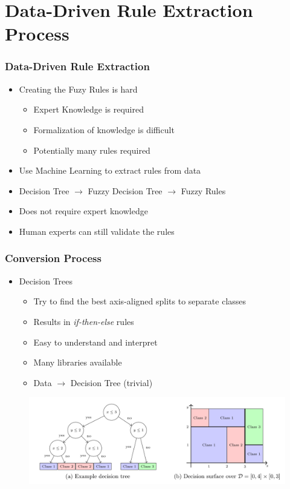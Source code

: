 \documentclass[
	10pt,
	t		%
]{beamer}
\begin{document}
\section{Data-Driven Rule Extraction Process}
\begin{frame}
	\frametitle{Data-Driven Rule Extraction}
	\begin{itemize}
		\item Creating the Fuzy Rules is hard
		      \begin{itemize}
			      \item Expert Knowledge is required
			      \item Formalization of knowledge is difficult
			      \item Potentially many rules required
		      \end{itemize}
		\item Use Machine Learning to extract rules from data
		\item Decision Tree $\rightarrow$ Fuzzy Decision Tree $\rightarrow$ Fuzzy Rules {\footnotesize \cite{CROCKETT20062809}}
		\item Does not require expert knowledge
		\item Human experts can still validate the rules
	\end{itemize}
\end{frame}

\begin{frame}
	\frametitle{Conversion Process}

	\begin{itemize}
		\item Decision Trees
		      \begin{itemize}
			      \item Try to find the best axis-aligned splits to separate classes
			      \item Results in \textit{if-then-else} rules
			      \item Easy to understand and interpret
			      \item Many libraries available
			      \item Data $\rightarrow$ Decision Tree (trivial)
		      \end{itemize}
	\end{itemize}

	\begin{figure}
		\centering
		\includegraphics[width=1\textwidth]{figures/decision-tree.png}
	\end{figure}

\end{frame}
\end{document}
